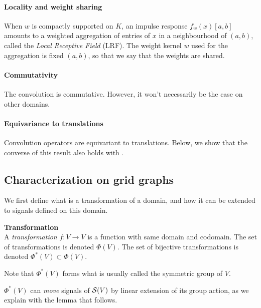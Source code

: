 \paragraph{Locality and weight sharing}
When $w$ is compactly supported on $K$, an impulse response $f_w(x)[a,b]$ amounts to a weighted aggregation of entries of $x$ in a neighbourhood of $(a,b)$, called the \emph{Local Receptive Field} (LRF). The weight kernel $w$ used for the aggregation is fixed \wrt $(a,b)$, so that we say that the weights are shared.

\paragraph{Commutativity}
The convolution is commutative. However, it won't necessarily be the case on other domains.

\paragraph{Equivariance to translations}
Convolution operators are equivariant to translations. Below, we show that the converse of this result also holds with .

\subsection{Characterization on grid graphs}

We first define what is a transformation of a domain, and how it can be extended to signals defined on this domain.

\begin{definition}\textbf{Transformation}\\
A \emph{transformation} $f: V \rightarrow V$ is a function with same domain and codomain. The set of transformations is denoted $\Phi(V)$. The set of bijective transformations is denoted $\Phi^*(V) \subset \Phi(V)$.
\end{definition}

\begin{remark}
Note that $\Phi^*(V)$ forms what is usually called the symmetric group of $V$.
\end{remark}

$\Phi^*(V)$ can \emph{move} signals of $\mathcal{S}(V)$ by linear extension of its group action, as we explain with the lemma that follows.

